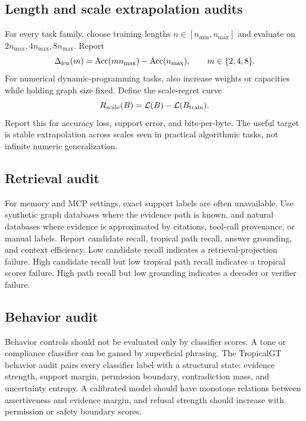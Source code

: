 \documentclass[11pt]{article}
\newcommand{\calL}{\mathcal{L}}
\begin{document}
\subsection{Length and scale extrapolation audits}
For every task family, choose training lengths $n\in[n_{\min},n_{\max}]$ and evaluate on $2n_{\max},4n_{\max},8n_{\max}$. Report
\begin{equation}
\Delta_{\rm len}(m)=\operatorname{Acc}(mn_{\max})-\operatorname{Acc}(n_{\max}),\qquad m\in\{2,4,8\}.
\end{equation}
For numerical dynamic-programming tasks, also increase weights or capacities while holding graph size fixed. Define the scale-regret curve
\begin{equation}
R_{\rm scale}(B)=\calL(B)-\calL(B_{\rm train}).
\end{equation}
Report this for accuracy loss, support error, and bits-per-byte. The useful target is stable extrapolation across scales seen in practical algorithmic tasks, not infinite numeric generalization.

\subsection{Retrieval audit}
For memory and MCP settings, exact support labels are often unavailable. Use synthetic graph databases where the evidence path is known, and natural databases where evidence is approximated by citations, tool-call provenance, or manual labels. Report candidate recall, tropical path recall, answer grounding, and context efficiency. Low candidate recall indicates a retrieval-projection failure. High candidate recall but low tropical path recall indicates a tropical scorer failure. High path recall but low grounding indicates a decoder or verifier failure.

\subsection{Behavior audit}
Behavior controls should not be evaluated only by classifier scores. A tone or compliance classifier can be gamed by superficial phrasing. The TropicalGT behavior audit pairs every classifier label with a structural state: evidence strength, support margin, permission boundary, contradiction mass, and uncertainty entropy. A calibrated model should have monotone relations between assertiveness and evidence margin, and refusal strength should increase with permission or safety boundary scores.
\end{document}
